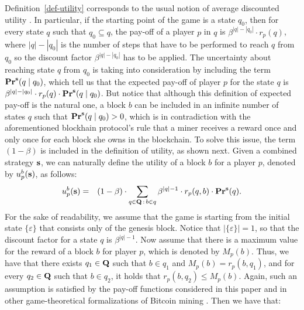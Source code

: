 Definition~\ref{def-utility} corresponds to the usual notion of average discounted utility . In particular, if the starting point of the game is a state $q_0$, then for every state $q$ such that $q_0 \subseteq q$, the pay-off of a player $p$ in $q$ is $\beta^{|q|-|q_0|} \cdot r_p(q)$, where $|q|-|q_0|$ is the number of steps that have to be performed to reach $q$ from $q_0$ so the discount factor $\beta^{|q|-|q_0|}$ has to be applied. The uncertainty  about reaching state $q$ from $q_0$ is taking into consideration by including the term $\mathbf{Pr}^{\mathbf{s}}(q \mid q_0)$, which tell us that the expected pay-off of player $p$ for the state $q$ is $\beta^{|q|-|q_0|} \cdot  r_p(q) \cdot \mathbf{Pr}^{\mathbf{s}}(q \mid q_0)$.
%
%
But notice that although this definition of expected pay-off is the natural one,
a block $b$ can be included in an infinite number of states $q$ such that $\mathbf{Pr}^{\mathbf{s}}(q \mid q_0) > 0$, which is in contradiction with the aforementioned blockhain protocol's rule that a miner receives a reward once and only once for each block she owns in the blockchain. To solve this issue, the term $(1 - \beta)$ is included in the definition of utility, as shown next.
Given a combined strategy $\mathbf{s}$, we can naturally define the utility of a block $b$ for a player $p$, denoted by $u_p^b(\mathbf{s})$,  as follows:
\begin{eqnarray*}
u_p^b(\mathbf{s}) & =  & (1 - \beta) \cdot  \sum_{q \in \mathbf{Q} \,:\, b \in q} \beta^{|q|-1} \cdot  r_p(q,b) \cdot \mathbf{Pr}^{\mathbf{s}}(q).
\end{eqnarray*}
For the sake of readability, we assume that the game is starting from the initial state $\{\varepsilon\}$ that consists only of the genesis block. Notice that $|\{\varepsilon\}| = 1$, so that the discount factor for a state $q$ is $\beta^{|q|-1}$. Now assume that there is a maximum value for the reward of a block $b$ for player $p$, which is denoted by $M_p(b)$. Thus, we have that there exists $q_1 \in \mathbf{Q}$ such that $b \in q_1$ and $M_p(b) = r_p(b,q_1)$, and for every $q_2 \in \mathbf{Q}$ such that $b \in q_2$, it holds that $r_p(b,q_2) \leq M_p(b)$. Again, such an assumption is satisfied by the pay-off functions considered in this paper and in other game-theoretical formalizations of Bitcoin mining \cite{mininggames:2016}. Then we have that:
